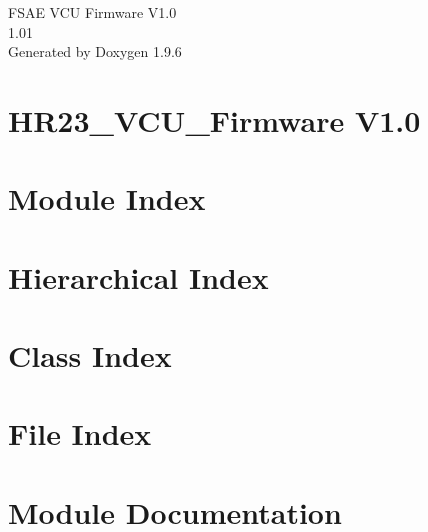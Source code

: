 \documentclass[twoside]{book}
\newcommand{\+}{\discretionary{\mbox{\scriptsize$\hookleftarrow$}}{}{}}
\newcommand{\clearemptydoublepage}{%
    \newpage{\pagestyle{empty}\cleardoublepage}%
  }
\begin{document}
  \raggedbottom
    \hypersetup{pageanchor=false,
                bookmarksnumbered=true,
                pdfencoding=unicode
               }
  \begin{titlepage}
  \vspace*{7cm}
  \begin{center}%
  {\Large FSAE VCU Firmware V1.\+0}\\
  [1ex]\large 1.\+01 \\
  \vspace*{1cm}
  {\large Generated by Doxygen 1.9.6}\\
  \end{center}
  \end{titlepage}
  \clearemptydoublepage
  \tableofcontents
  \clearemptydoublepage
  \hypersetup{pageanchor=true}
\chapter{HR23\+\_\+\+VCU\+\_\+\+Firmware V1.0}
\label{md__r_e_a_d_m_e}

\chapter{Module Index}

\chapter{Hierarchical Index}

\chapter{Class Index}

\chapter{File Index}

\chapter{Module Documentation}


































\end{document}
